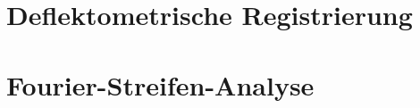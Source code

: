 \documentclass[ngerman,11pt,a4paper]{report}
\begin{document}
	{
		\FloatBarrier %
		\chapter{Deflektometrische Registrierung}
		\label{chp:deflektometrischeRegistrierung}
		
	}
	
	{
		\FloatBarrier %
		\chapter{Fourier-Streifen-Analyse}
		
	}
	
	{
		\FloatBarrier %
		\newpage
		\printbibliography[title = Quellenverzeichnis]
	}
\end{document}
